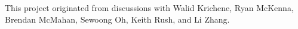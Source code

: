 This project originated from discussions with Walid Krichene, Ryan McKenna, Brendan McMahan, Sewoong Oh, Keith Rush, and Li Zhang.